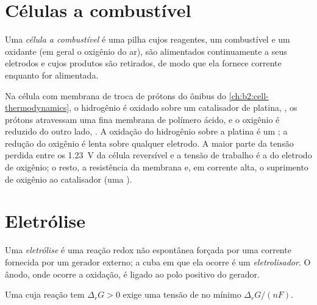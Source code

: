\section{Células a combustível}

\begin{definition}\label{def:b2:batteries-electrolysis:fuel-cell}
Uma \emph{célula a combustível} é uma pilha cujos
reagentes, um combustível e um oxidante (em geral o oxigênio do ar), são
alimentados continuamente a seus eletrodos e cujos produtos são retirados, de
modo que ela fornece corrente enquanto for alimentada.
\end{definition}

Na célula com membrana de troca de prótons do ônibus do
\cref{ch:b2:cell-thermodynamics}, o hidrogênio é oxidado sobre um catalisador
de platina, , os prótons atravessam uma fina membrana de
polímero ácido, e o oxigênio é reduzido do outro lado, .
A oxidação do hidrogênio sobre a platina é um ; a redução do
oxigênio é lenta sobre qualquer eletrodo. A maior parte da tensão perdida
entre os \qty{1.23}{V} da célula reversível e a tensão de trabalho é a
 do eletrodo de oxigênio; o resto, a resistência da membrana e, em
corrente alta, o suprimento de oxigênio ao catalisador (uma ).

\section{Eletrólise}

\begin{definition}[Eletrólise]\label{def:b2:batteries-electrolysis:electrolysis}
Uma \emph{eletrólise} é uma reação redox não espontânea
forçada por uma corrente fornecida por um gerador externo; a cuba em que ela
ocorre é um \emph{eletrolisador}. O ânodo, onde ocorre a
oxidação, é ligado ao polo positivo do gerador.
\end{definition}

\begin{proposition}\label{prop:b2:batteries-electrolysis:minimum-voltage}
Uma  cuja reação tem $\Delta_r G > 0$ exige uma tensão de no
mínimo $\Delta_r G/(nF)$.
\end{proposition}

